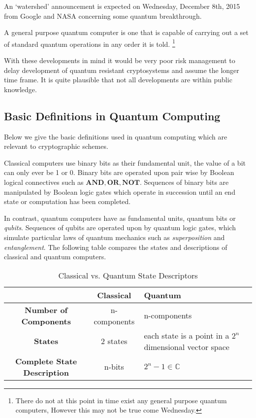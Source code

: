 \begin{nt}
An `watershed' announcement is expected on Wednesday, December 8th, 2015 from Google and NASA concerning some quantum breakthrough.
\end{nt}
 
 
A general purpose quantum computer is one that is capable of carrying out a set of standard quantum operations in any order it is told.
\footnote{There do not at this point in time exist any general purpose quantum computers, However this may not be true come Wednesday.} 

 
With these developments in mind it would be very poor risk management to delay development of quantum resistant cryptosystems and assume the longer time frame. It is quite plausible that not all developments are within public knowledge. 


\subsection{Basic Definitions in Quantum Computing}


Below we give the basic definitions used in quantum computing which are relevant to cryptographic schemes. 

Classical computers use binary bits as their fundamental unit, the value of a bit can only ever be 1 or 0. Binary bits are operated upon pair wise by Boolean logical connectives such as $\mathbf{AND, OR, NOT}$. Sequences of binary bits are manipulated by Boolean logic gates which operate in succession until an end state or computation has been completed.  


In contrast, quantum computers have as fundamental units, quantum bits or \emph{qubits}. Sequences of qubits are operated upon by quantum logic gates, which simulate particular laws of quantum mechanics such as \emph{superposition} and \emph{entanglement}. The following table compares the states and descriptions of classical and quantum computers.


\begin{table}
\begin{center}
\begin{tabularx}{400pt}{|c|c|X|} \hline 
     & \textbf{Classical} & \textbf{Quantum} \\ \hline
    \textbf{Number of Components} & n-components & n-components \\ \hline
    \textbf{States} & 2 states & each state is a point in a $2^{n}$ dimensional vector space \\ \hline
    \textbf{Complete State Description} & n-bits & $2^{n}-1 \in \mathbb{C}$ \\ \hline
\end{tabularx}
\caption{Classical vs. Quantum State Descriptors}
\label{tbl:classvquantstate}
\end{center}
\end{table}




